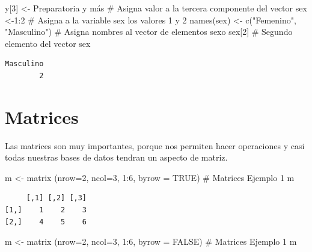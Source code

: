 \documentclass[
  letterpaper,
  DIV=11,
  numbers=noendperiod]{scrreprt}
\newenvironment{Shaded}{\begin{snugshade}}{\end{snugshade}}
\newcommand{\AttributeTok}[1]{\textcolor[rgb]{0.40,0.45,0.13}{#1}}
\newcommand{\CommentTok}[1]{\textcolor[rgb]{0.37,0.37,0.37}{#1}}
\newcommand{\ConstantTok}[1]{\textcolor[rgb]{0.56,0.35,0.01}{#1}}
\newcommand{\DecValTok}[1]{\textcolor[rgb]{0.68,0.00,0.00}{#1}}
\newcommand{\FunctionTok}[1]{\textcolor[rgb]{0.28,0.35,0.67}{#1}}
\newcommand{\NormalTok}[1]{\textcolor[rgb]{0.00,0.23,0.31}{#1}}
\newcommand{\OtherTok}[1]{\textcolor[rgb]{0.00,0.23,0.31}{#1}}
\newcommand{\SpecialCharTok}[1]{\textcolor[rgb]{0.37,0.37,0.37}{#1}}
\newcommand{\StringTok}[1]{\textcolor[rgb]{0.13,0.47,0.30}{#1}}
\begin{document}
\begin{Shaded}
\begin{Highlighting}[]
\NormalTok{y[}\DecValTok{3}\NormalTok{] }\OtherTok{\textless{}{-}} \StringTok{\textquotesingle{}Preparatoria y más\textquotesingle{}} \CommentTok{\# Asigna valor a la tercera componente del vector}
\NormalTok{sex }\OtherTok{\textless{}{-}}\DecValTok{1}\SpecialCharTok{:}\DecValTok{2}         \CommentTok{\# Asigna a la variable sex los valores 1 y 2}
\FunctionTok{names}\NormalTok{(sex) }\OtherTok{\textless{}{-}} \FunctionTok{c}\NormalTok{(}\StringTok{"Femenino"}\NormalTok{, }\StringTok{"Masculino"}\NormalTok{) }\CommentTok{\# Asigna nombres al vector de elementos sexo}
\NormalTok{sex[}\DecValTok{2}\NormalTok{]            }\CommentTok{\# Segundo elemento del vector sex}
\end{Highlighting}
\end{Shaded}

\begin{verbatim}
Masculino 
        2 
\end{verbatim}

\hypertarget{matrices}{%
\section{Matrices}\label{matrices}}

Las matrices son muy importantes, porque nos permiten hacer operaciones
y casi todas nuestras bases de datos tendran un aspecto de matriz.

\begin{Shaded}
\begin{Highlighting}[]
\NormalTok{m }\OtherTok{\textless{}{-}} \FunctionTok{matrix}\NormalTok{ (}\AttributeTok{nrow=}\DecValTok{2}\NormalTok{, }\AttributeTok{ncol=}\DecValTok{3}\NormalTok{, }\DecValTok{1}\SpecialCharTok{:}\DecValTok{6}\NormalTok{, }\AttributeTok{byrow =} \ConstantTok{TRUE}\NormalTok{) }\CommentTok{\# Matrices Ejemplo 1}
\NormalTok{m}
\end{Highlighting}
\end{Shaded}

\begin{verbatim}
     [,1] [,2] [,3]
[1,]    1    2    3
[2,]    4    5    6
\end{verbatim}

\begin{Shaded}
\begin{Highlighting}[]
\NormalTok{m }\OtherTok{\textless{}{-}} \FunctionTok{matrix}\NormalTok{ (}\AttributeTok{nrow=}\DecValTok{2}\NormalTok{, }\AttributeTok{ncol=}\DecValTok{3}\NormalTok{, }\DecValTok{1}\SpecialCharTok{:}\DecValTok{6}\NormalTok{, }\AttributeTok{byrow =} \ConstantTok{FALSE}\NormalTok{) }\CommentTok{\# Matrices Ejemplo 1}
\NormalTok{m}
\end{Highlighting}
\end{Shaded}
\end{document}

